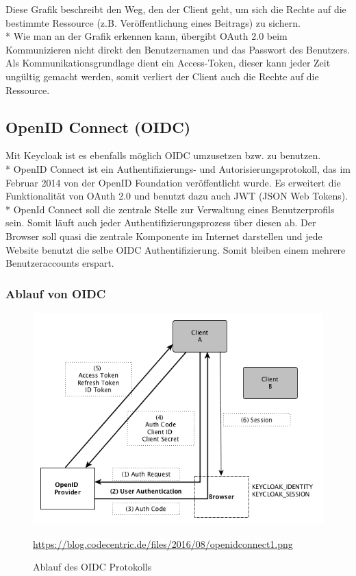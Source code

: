 Diese Grafik beschreibt den Weg, den der Client geht, um sich die Rechte auf die bestimmte Ressource (z.B. Veröffentlichung eines Beitrags) zu sichern. \\*
Wie man an der Grafik erkennen kann, übergibt OAuth 2.0 beim Kommunizieren nicht direkt den Benutzernamen und das Passwort des Benutzers. 
Als Kommunikationsgrundlage dient ein Access-Token, dieser kann jeder Zeit ungültig gemacht werden, somit verliert der Client auch die Rechte auf die Ressource. \cite{KeycloakCodeCentric}

\subsection{OpenID Connect (OIDC)}
Mit Keycloak ist es ebenfalls möglich OIDC umzusetzen bzw. zu benutzen. \\*
OpenID Connect ist ein Authentifizierungs- und Autorisierungsprotokoll, das im Februar 2014 von der OpenID Foundation veröffentlicht wurde.
Es erweitert die Funktionalität von OAuth 2.0 und benutzt dazu auch JWT (JSON Web Tokens). \\*
OpenId Connect soll die zentrale Stelle zur Verwaltung eines Benutzerprofils sein. Somit läuft auch jeder Authentifizierungsprozess über diesen ab.
Der Browser soll quasi die zentrale Komponente im Internet darstellen und jede Website benutzt die selbe OIDC Authentifizierung. Somit bleiben einem mehrere Benutzeraccounts erspart. \cite{KeycloakCodeCentric}
\pagebreak

\subsubsection{Ablauf von OIDC}
\begin{figure}[htp]
    \centering
    \includegraphics[scale=0.6]{pics/Ablauf_OIDC.png}
    \caption{Ablauf des OIDC Protokolls}
    \small \url{https://blog.codecentric.de/files/2016/08/openidconnect1.png} 
    \label{fig:impl:OIDCProtocoll}
\end{figure}

